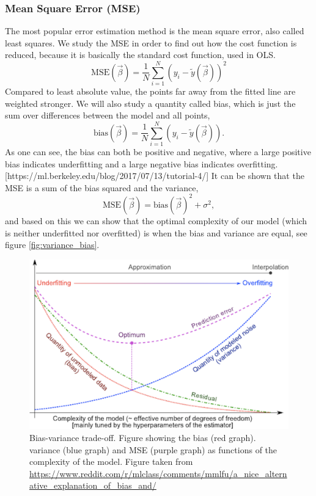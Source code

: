\subsubsection{Mean Square Error (MSE)} \label{sec:MSE}
The most popular error estimation method is the mean square error, also called least squares. \cite{hastie01statisticallearning} We study the MSE in order to find out how the cost function is reduced, because it is basically the standard cost function, used in OLS. 
\begin{equation}
\text{MSE}(\vec{\beta})=\frac{1}{N}\sum_{i=1}^N(y_i-\tilde{y}(\vec{\beta}))^2
\end{equation}
Compared to least absolute value, the points far away from the fitted line are weighted stronger. We will also study a quantity called bias, which is just the sum over differences between the model and all points,
\begin{equation}
\text{bias}(\vec{\beta})=\frac{1}{N}\sum_{i=1}^N(y_i-\tilde{y}(\vec{\beta})).
\end{equation}
As one can see, the bias can both be positive and negative, where a large positive bias indicates underfitting and a large negative bias indicates overfitting. [https://ml.berkeley.edu/blog/2017/07/13/tutorial-4/] It can be shown that the MSE is a sum of the bias squared and the variance,
\begin{equation}
\text{MSE}(\vec{\beta})=\text{bias}(\vec{\beta})^2+\sigma^2, 
\end{equation}
and based on this we can show that the optimal complexity of our model (which is neither underfitted nor overfitted) is when the bias and variance are equal, see figure \eqref{fig:variance_bias}.

 \begin{figure} [h]
	\centering
	\includegraphics[scale=0.3]{../plots/variance_bias.png}
	\caption{Bias-variance trade-off. Figure showing the bias (red graph). variance (blue graph) and MSE (purple graph) as functions of the complexity of the model. Figure taken from \url{https://www.reddit.com/r/mlclass/comments/mmlfu/a_nice_alternative_explanation_of_bias_and/}}
	\label{fig:variance_bias}
\end{figure}

